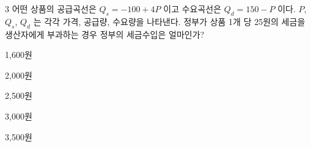 \begin{question}{3}
어떤 상품의 공급곡선은 $Q_{ s } = -100+4P$ 이고 수요곡선은 $Q_{ d } =150-P$ 이다. $P$, $Q_{ s }$, $Q_{ d }$ 는 각각 가격, 공급량, 수요량을 나타낸다. 정부가 상품 1개 당 25원의 세금을 생산자에게 부과하는 경우 정부의 세금수입은 얼마인가?
\begin{choices}
  \item 1,600원
  \item 2,000원
  \item 2,500원
  \item 3,000원
  \item 3,500원
\end{choices}
\end{question}
